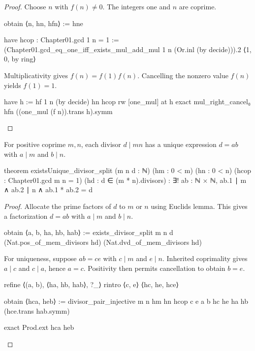\begin{proof}
  Choose $n$ with $f(n)\ne0$.
  The integers one and $n$ are coprime.

  \begin{lean}
    obtain ⟨n, hn, hfn⟩ := hne

    have hcop : Chapter01.gcd 1 n = 1 :=
      (Chapter01.gcd_eq_one_iff_exists_mul_add_mul 1 n (Or.inl (by decide))).2
        ⟨1, 0, by ring⟩
  \end{lean}

  Multiplicativity gives $f(n)=f(1)f(n)$.
  Cancelling the nonzero value $f(n)$ yields $f(1)=1$.

  \begin{lean}
    have h := hf 1 n (by decide) hn hcop
    rw [one_mul] at h
    exact mul_right_cancel₀ hfn ((one_mul (f n)).trans h).symm
  \end{lean}
\end{proof}

\begin{theorem}
  \label{ent:thm:existsunique-divisor-split}
  For positive coprime $m,n$, each divisor $d\mid mn$ has a unique expression $d=ab$ with $a\mid
    m$ and $b\mid n$.

  \begin{lean}
    theorem existsUnique_divisor_split (m n d : ℕ) (hm : 0 < m) (hn : 0 < n)
        (hcop : Chapter01.gcd m n = 1) (hd : d ∈ (m * n).divisors) :
        ∃! ab : ℕ × ℕ, ab.1 ∣ m ∧ ab.2 ∣ n ∧ ab.1 * ab.2 = d
  \end{lean}
\end{theorem}

\begin{proof}
  Allocate the prime factors of $d$ to $m$ or $n$ using Euclid\textquotesingle s lemma.
  This gives a factorization $d=ab$ with $a\mid m$ and $b\mid n$.

  \begin{lean}
    obtain ⟨a, b, ha, hb, hab⟩ := exists_divisor_split m n d
      (Nat.pos_of_mem_divisors hd) (Nat.dvd_of_mem_divisors hd)
  \end{lean}

  For uniqueness, suppose $ab=ce$ with $c\mid m$ and $e\mid n$.
  Inherited coprimality gives $a\mid c$ and $c\mid a$, hence $a=c$.
  Positivity then permits cancellation to obtain $b=e$.

  \begin{lean}
    refine ⟨(a, b), ⟨ha, hb, hab⟩, ?_⟩
    rintro ⟨c, e⟩ ⟨hc, he, hce⟩

    obtain ⟨hca, heb⟩ := divisor_pair_injective m n hm hn hcop c e a b hc he ha hb
      (hce.trans hab.symm)

    exact Prod.ext hca heb
  \end{lean}
\end{proof}


